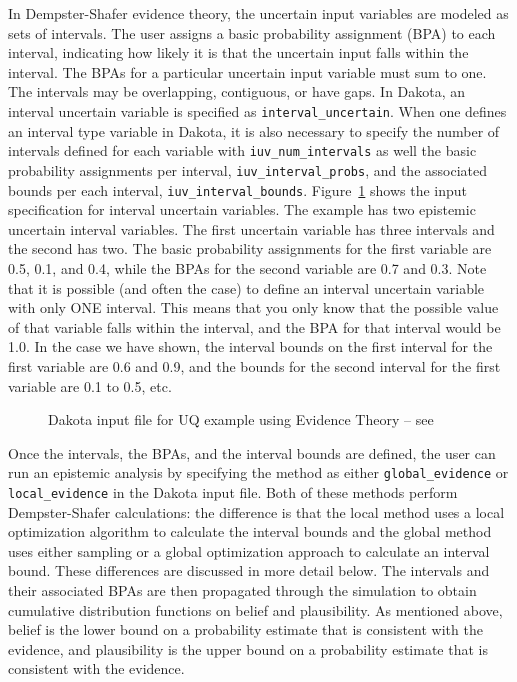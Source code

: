 In Dempster-Shafer evidence theory, the uncertain input variables are
modeled as sets of intervals. The user assigns a basic probability
assignment (BPA) to each interval, indicating how likely it is that
the uncertain input falls within the interval. The BPAs for a
particular uncertain input variable must sum to one. The intervals
may be overlapping, contiguous, or have gaps. In Dakota, an interval
uncertain variable is specified as \texttt{interval\_uncertain}. When
one defines an interval type variable in Dakota, it is also necessary
to specify the number of intervals defined for each variable with
\texttt{iuv\_num\_intervals} as well the basic probability assignments
per interval, \texttt{iuv\_interval\_probs}, and the associated bounds
per each interval, \texttt{iuv\_interval\_bounds}. 
Figure~\ref{uq:figure16} shows the input specification for interval
uncertain variables. 
The example has two epistemic uncertain interval variables. 
The first uncertain
variable has three intervals and the second has two. The basic
probability assignments for the first variable are 0.5, 0.1, and 0.4,
while the BPAs for the second variable are 0.7 and 0.3. Note that it
is possible (and often the case) to define an interval uncertain
variable with only ONE interval. This means that you only know that
the possible value of that variable falls within the interval, and the
BPA for that interval would be 1.0. In the case we have shown, the
interval bounds on the first interval for the first variable are 0.6
and 0.9, and the bounds for the second interval for the first variable
are 0.1 to 0.5, etc.

\begin{figure}[htbp!]
  \centering
  \begin{bigbox}
    \begin{small}
    \end{small}
  \end{bigbox}
\caption{Dakota input file for UQ example using Evidence Theory --
see \protect{} }
\label{uq:figure16}
\end{figure}

Once the intervals, the BPAs, and the interval bounds are defined, 
the user can run an epistemic analysis by specifying the method as 
either \texttt{global\_evidence} or 
\texttt{local\_evidence} in the Dakota input file. 
Both of these methods perform Dempster-Shafer calculations:  
the difference is that the local method uses a local optimization 
algorithm to calculate the interval bounds and the global 
method uses either sampling or a global optimization approach to 
calculate an interval bound. These differences are discussed in 
more detail below. 
The intervals and their associated BPAs are then propagated through
the simulation to obtain cumulative distribution functions on belief
and plausibility. As mentioned above, belief is the lower bound on a
probability estimate that is consistent with the evidence, and
plausibility is the upper bound on a probability estimate that is
consistent with the evidence. 

